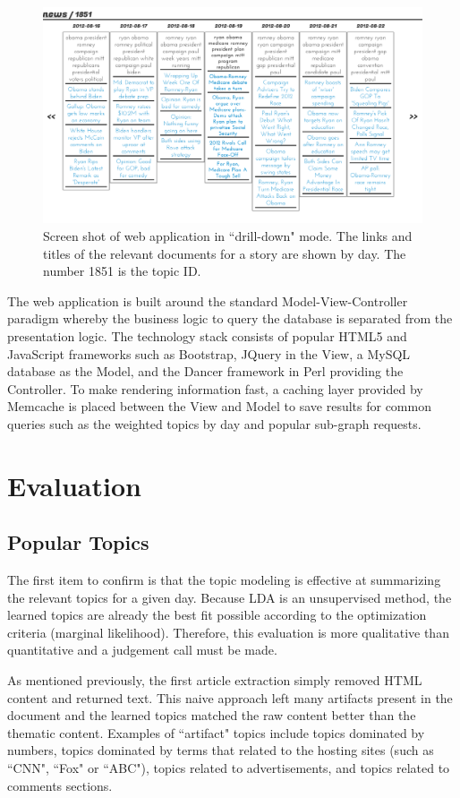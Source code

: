 \documentclass[10pt]{article}
\begin{document}
\begin{figure}
\centering
\includegraphics[scale=0.3]{img/story-view.png}
\caption{Screen shot of web application in ``drill-down" mode. The links and titles of the relevant documents for a story are shown by day.  The number 1851 is the topic ID.}
\end{figure}

The web application is built around the standard Model-View-Controller paradigm whereby the business logic to query the database is separated from the presentation logic.  The technology stack consists of popular HTML5 and JavaScript frameworks such as Bootstrap, JQuery in the View, a MySQL database as the Model, and the Dancer framework in Perl providing the Controller.  To make rendering information fast, a caching layer provided by Memcache is placed between the View and Model to save results for common queries such as the weighted topics by day and popular sub-graph requests.

\section {Evaluation}

\subsection {Popular Topics}
The first item to confirm is that the topic modeling is effective at summarizing the relevant topics for a given day. Because LDA is an unsupervised method, the learned topics are already the best fit possible according to the optimization criteria (marginal likelihood).  Therefore, this evaluation is more qualitative than quantitative and a judgement call must be made.

As mentioned previously, the first article extraction simply removed HTML content and returned text.  This naive approach left many artifacts present in the document and the learned topics matched the raw content better than the thematic content.  Examples of ``artifact" topics include topics dominated by numbers, topics dominated by terms that related to the hosting sites (such as ``CNN", ``Fox" or ``ABC"), topics related to advertisements, and topics related to comments sections.  
\end{document}

